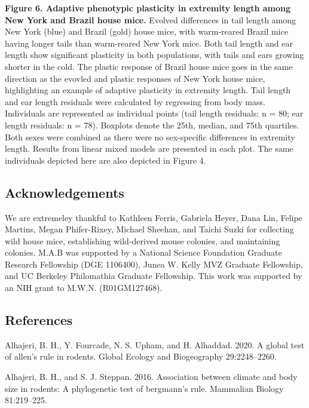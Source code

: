 \documentclass[]{article}
\begin{document}
\textbf{Figure 6. Adaptive phenotypic plasticity in extremity length
among New York and Brazil house mice.} Evolved differences in tail
length among New York (blue) and Brazil (gold) house mice, with
warm-reared Brazil mice having longer tails than warm-reared New York
mice. Both tail length and ear length show significant plasticity in
both populations, with tails and ears growing shorter in the cold. The
plastic response of Brazil house mice goes in the same direction as the
evovled and plastic responses of New York house mice, highlighting an
example of adaptive plasticity in extremity length. Tail length and ear
length residuals were calculated by regressing from body mass.
Individuals are represented as individual points (tail length residuals:
n = 80; ear length residuals: n = 78). Boxplots denote the 25th, median,
and 75th quartiles. Both sexes were combined as there were no
sex-specific differences in extremity length. Results from linear mixed
models are presented in each plot. The same individuals depicted here
are also depicted in Figure 4.

\newpage

\hypertarget{acknowledgements}{%
\subsection{Acknowledgements}\label{acknowledgements}}

We are extremeley thankful to Kathleen Ferris, Gabriela Heyer, Dana Lin,
Felipe Martins, Megan Phifer-Rixey, Michael Sheehan, and Taichi Suzki
for collecting wild house mice, establishing wild-derived mouse
colonies, and maintaining colonies. M.A.B was supported by a National
Science Foundation Graduate Research Fellowship (DGE 1106400), Junea W.
Kelly MVZ Graduate Fellowship, and UC Berkeley Philomathia Graduate
Fellowship. This work was supported by an NIH grant to M.W.N.
(R01GM127468).

\newpage

\hypertarget{references}{%
\subsection{References}\label{references}}

\hypertarget{refs}{}
\leavevmode\hypertarget{ref-Alhajeri2020}{}%
Alhajeri, B. H., Y. Fourcade, N. S. Upham, and H. Alhaddad. 2020. A
global test of allen's rule in rodents. Global Ecology and Biogeography
29:2248--2260.

\leavevmode\hypertarget{ref-Alhajeri2016}{}%
Alhajeri, B. H., and S. J. Steppan. 2016. Association between climate
and body size in rodents: A phylogenetic test of bergmann's rule.
Mammalian Biology 81:219--225.
\end{document}
